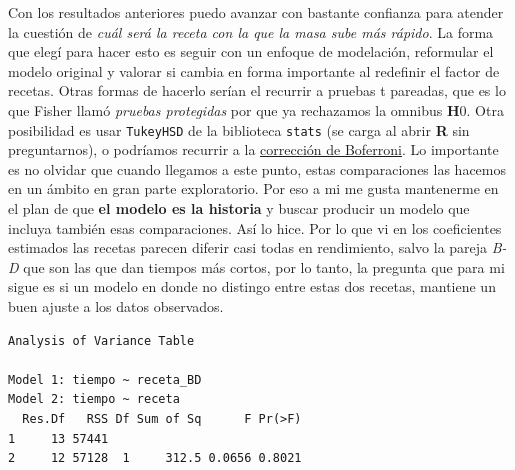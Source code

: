\documentclass[
  letterpaper,
  DIV=11,
  numbers=noendperiod]{scrartcl}
\newenvironment{Shaded}{\begin{snugshade}}{\end{snugshade}}
\newcommand{\AttributeTok}[1]{\textcolor[rgb]{0.40,0.45,0.13}{#1}}
\newcommand{\FunctionTok}[1]{\textcolor[rgb]{0.28,0.35,0.67}{#1}}
\newcommand{\NormalTok}[1]{\textcolor[rgb]{0.00,0.23,0.31}{#1}}
\newcommand{\OtherTok}[1]{\textcolor[rgb]{0.00,0.23,0.31}{#1}}
\newcommand{\SpecialCharTok}[1]{\textcolor[rgb]{0.37,0.37,0.37}{#1}}
\newcommand{\StringTok}[1]{\textcolor[rgb]{0.13,0.47,0.30}{#1}}
\begin{document}
Con los resultados anteriores puedo avanzar con bastante confianza para
atender la cuestión de \emph{cuál será la receta con la que la masa sube
más rápido}. La forma que elegí para hacer esto es seguir con un enfoque
de modelación, reformular el modelo original y valorar si cambia en
forma importante al redefinir el factor de recetas. Otras formas de
hacerlo serían el recurrir a pruebas t pareadas, que es lo que Fisher
llamó \emph{pruebas protegidas} por que ya rechazamos la omnibus
\textbf{H}0. Otra posibilidad es usar \texttt{TukeyHSD} de la biblioteca
\texttt{stats} (se carga al abrir \textbf{R} sin preguntarnos), o
podríamos recurrir a la
\href{https://towardsdatascience.com/anova-vs-bonferroni-correction-c8573936a64e}{corrección
de Boferroni}. Lo importante es no olvidar que cuando llegamos a este
punto, estas comparaciones las hacemos en un ámbito en gran parte
exploratorio. Por eso a mi me gusta mantenerme en el plan de que
\textbf{el modelo es la historia} y buscar producir un modelo que
incluya también esas comparaciones. Así lo hice. Por lo que vi en los
coeficientes estimados las recetas parecen diferir casi todas en
rendimiento, salvo la pareja \emph{B-D} que son las que dan tiempos más
cortos, por lo tanto, la pregunta que para mi sigue es si un modelo en
donde no distingo entre estas dos recetas, mantiene un buen ajuste a los
datos observados.

\begin{Shaded}
\end{Shaded}

\begin{verbatim}
Analysis of Variance Table

Model 1: tiempo ~ receta_BD
Model 2: tiempo ~ receta
  Res.Df   RSS Df Sum of Sq      F Pr(>F)
1     13 57441                           
2     12 57128  1     312.5 0.0656 0.8021
\end{verbatim}
\end{document}
